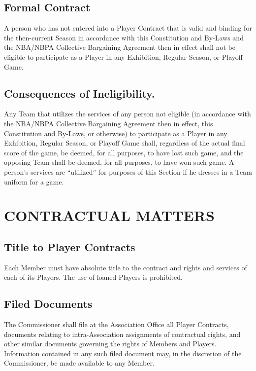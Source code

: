 \documentclass[]{book}
\theoremstyle{definition}
\theoremstyle{definition}
\theoremstyle{definition}
\theoremstyle{remark}
\begin{document}
\subsection{Formal Contract}\label{formal-contract}

A person who has not entered into a Player Contract that is valid and
binding for the then-current Season in accordance with this Constitution
and By-Laws and the NBA/NBPA Collective Bargaining Agreement then in
effect shall not be eligible to participate as a Player in any
Exhibition, Regular Season, or Playoff Game.

\subsection{Consequences of
Ineligibility.}\label{consequences-of-ineligibility.}

Any Team that utilizes the services of any person not eligible (in
accordance with the NBA/NBPA Collective Bargaining Agreement then in
effect, this Constitution and By-Laws, or otherwise) to participate as a
Player in any Exhibition, Regular Season, or Playoff Game shall,
regardless of the actual final score of the game, be deemed, for all
purposes, to have lost such game, and the opposing Team shall be deemed,
for all purposes, to have won such game. A person's services are
``utilized'' for purposes of this Section if he dresses in a Team
uniform for a game.

\section{CONTRACTUAL MATTERS}\label{contractual-matters}

\subsection{Title to Player Contracts}\label{title-to-player-contracts}

Each Member must have absolute title to the contract and rights and
services of each of its Players. The use of loaned Players is
prohibited.

\subsection{Filed Documents}\label{filed-documents}

The Commissioner shall file at the Association Office all Player
Contracts, documents relating to intra-Association assignments of
contractual rights, and other similar documents governing the rights of
Members and Players. Information contained in any such filed document
may, in the discretion of the Commissioner, be made available to any
Member.
\end{document}

